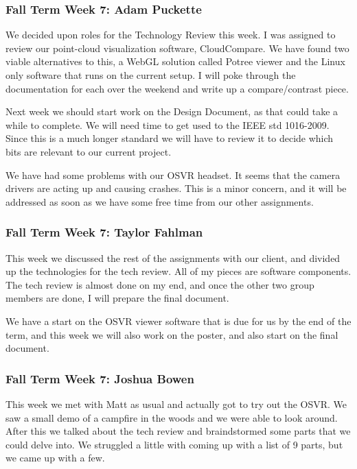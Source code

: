 \documentclass[draftclsnofoot,onecolumn]{IEEEtran}
\begin{document}
\subsubsection{Fall Term Week 7: Adam Puckette}

We decided upon roles for the Technology Review this week. I was assigned to review our point-cloud visualization software, CloudCompare. We have found two viable alternatives to this, a WebGL solution called Potree viewer and the Linux only software that runs on the current setup. I will poke through the documentation for each over the weekend and write up a compare/contrast piece.

Next week we should start work on the Design Document, as that could take a while to complete. We will need time to get used to the IEEE std 1016-2009. Since this is a much longer standard we will have to review it to decide which bits are relevant to our current project.

We have had some problems with our OSVR headset. It seems that the camera drivers are acting up and causing crashes. This is a minor concern, and it will be addressed as soon as we have some free time from our other assignments.

\subsubsection{Fall Term Week 7: Taylor Fahlman}

This week we discussed the rest of the assignments with our client, and divided up the technologies for the tech review. All of my pieces are software components. The tech review is almost done on my end, and once the other two group members are done, I will prepare the final document.

We have a start on the OSVR viewer software that is due for us by the end of the term, and this week we will also work on the poster, and also start on the final document.

\subsubsection{Fall Term Week 7: Joshua Bowen}

This week we met with Matt as usual and actually got to try out the OSVR. We saw a small demo of a campfire in the woods and we were able to look around. After this we talked about the tech review and braindstormed some parts that we could delve into. We struggled a little with coming up with a list of 9 parts, but we came up with a few.
\end{document}
